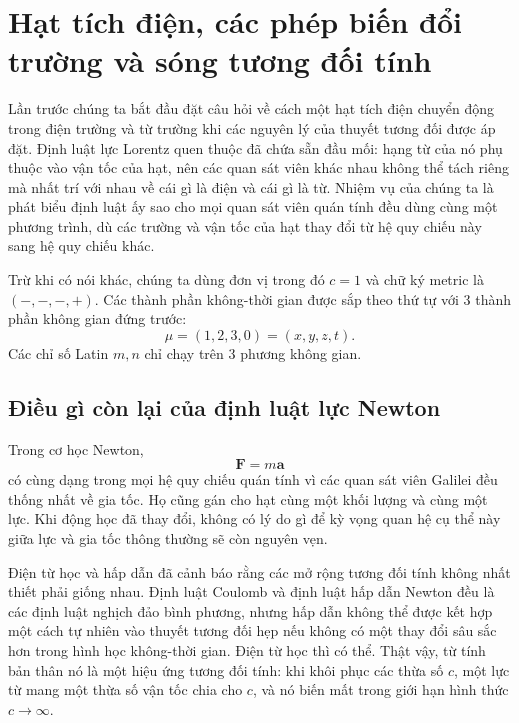 \chapter{Hạt tích điện, các phép biến đổi trường và sóng tương đối tính}

Lần trước chúng ta bắt đầu đặt câu hỏi về cách một hạt tích điện chuyển động trong điện trường và từ trường khi các nguyên lý của thuyết tương đối được áp đặt. Định luật lực Lorentz quen thuộc đã chứa sẵn đầu mối: hạng từ của nó phụ thuộc vào vận tốc của hạt, nên các quan sát viên khác nhau không thể tách riêng mà nhất trí với nhau về cái gì là điện và cái gì là từ. Nhiệm vụ của chúng ta là phát biểu định luật ấy sao cho mọi quan sát viên quán tính đều dùng cùng một phương trình, dù các trường và vận tốc của hạt thay đổi từ hệ quy chiếu này sang hệ quy chiếu khác.

Trừ khi có nói khác, chúng ta dùng đơn vị trong đó \(c=1\) và chữ ký metric là \((-,-,-,+)\). Các thành phần không-thời gian được sắp theo thứ tự với 3 thành phần không gian đứng trước:
\begin{equation}
  \mu=(1,2,3,0)=(x,y,z,t).
\end{equation}
Các chỉ số Latin \(m,n\) chỉ chạy trên 3 phương không gian.

\section{Điều gì còn lại của định luật lực Newton}

Trong cơ học Newton,
\begin{equation}
  \boldsymbol F=m\boldsymbol a
\end{equation}
có cùng dạng trong mọi hệ quy chiếu quán tính vì các quan sát viên Galilei đều thống nhất về gia tốc. Họ cũng gán cho hạt cùng một khối lượng và cùng một lực. Khi động học đã thay đổi, không có lý do gì để kỳ vọng quan hệ cụ thể này giữa lực và gia tốc thông thường sẽ còn nguyên vẹn.

Điện từ học và hấp dẫn đã cảnh báo rằng các mở rộng tương đối tính không nhất thiết phải giống nhau. Định luật Coulomb và định luật hấp dẫn Newton đều là các định luật nghịch đảo bình phương, nhưng hấp dẫn không thể được kết hợp một cách tự nhiên vào thuyết tương đối hẹp nếu không có một thay đổi sâu sắc hơn trong hình học không-thời gian. Điện từ học thì có thể. Thật vậy, từ tính bản thân nó là một hiệu ứng tương đối tính: khi khôi phục các thừa số \(c\), một lực từ mang một thừa số vận tốc chia cho \(c\), và nó biến mất trong giới hạn hình thức \(c\to\infty\).

